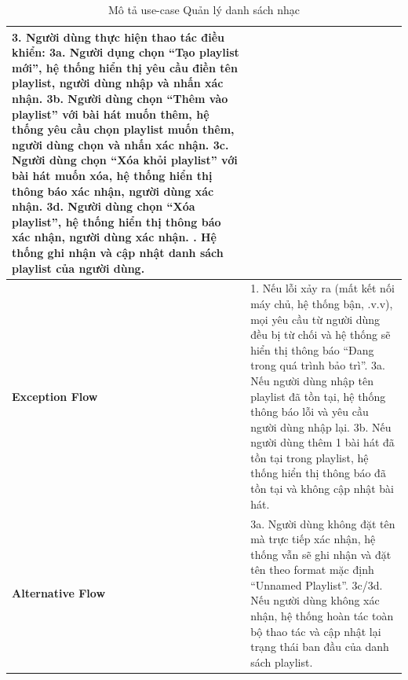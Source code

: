 \documentclass[a4paper]{article}
\newcommand{\cach}{\hspace*{1.5em}\ignorespaces}
\begin{document}
\begin{table}[H]
\begin{tabularx}{\textwidth}{|l|X|}
		3. Người dùng thực hiện thao tác điều khiển: \newline
		\cach 3a. Người dụng chọn ``Tạo playlist mới'', hệ thống hiển thị yêu cầu điền tên playlist, người dùng nhập và nhấn xác nhận. \newline
		\cach 3b. Người dùng chọn ``Thêm vào playlist'' với bài hát muốn thêm, hệ thống yêu cầu chọn playlist muốn thêm, người dùng chọn và nhấn xác nhận. \newline
		\cach 3c. Người dùng chọn ``Xóa khỏi playlist'' với bài hát muốn xóa, hệ thống hiển thị thông báo xác nhận, người dùng xác nhận. \newline
		\cach 3d. Người dùng chọn ``Xóa playlist'', hệ thống hiển thị thông báo xác nhận, người dùng xác nhận. \newline
		4. Hệ thống ghi nhận và cập nhật danh sách playlist của người dùng.                                                                                                                                         \\ \hline
		\textbf{Exception Flow}
		                       & 1. Nếu lỗi xảy ra (mất kết nối máy chủ, hệ thống bận, .v.v), mọi yêu cầu từ người dùng đều bị từ chối và hệ thống sẽ hiển thị thông báo ``Đang trong quá trình bảo trì''. \newline
		3a. Nếu người dùng nhập tên playlist đã tồn tại, hệ thống thông báo lỗi và yêu cầu người dùng nhập lại. \newline
		3b. Nếu người dùng thêm 1 bài hát đã tồn tại trong playlist, hệ thống hiển thị thông báo đã tồn tại và không cập nhật bài hát.                                                                              \\ \hline
		\textbf{Alternative Flow}
		                       & 3a. Người dùng không đặt tên mà trực tiếp xác nhận, hệ thống vẫn sẽ ghi nhận và đặt tên theo format mặc định ``Unnamed Playlist''.\newline
		3c/3d. Nếu người dùng không xác nhận, hệ thống hoàn tác toàn bộ thao tác và cập nhật lại trạng thái ban đầu của danh sách playlist.                                                                         \\ \hline
	\end{tabularx}
	\caption{Mô tả use-case Quản lý danh sách nhạc}
\end{table}

\end{document}
